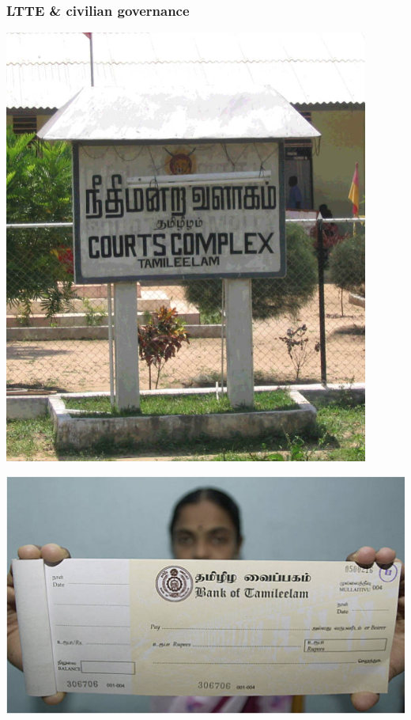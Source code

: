 \documentclass[aspectratio=43]{beamer}
\begin{document}
\begin{frame}
\frametitle{LTTE \& civilian governance}
\centering

\begin{minipage}{0.4\textwidth}\centering
  \includegraphics[width = 0.9\textwidth]{img/tamileelam_courts}
  \vfill
\end{minipage}\hfill
\begin{minipage}{0.59\textwidth}\centering
  \includegraphics[width = \textwidth]{img/tamileelam_bank}\\

\end{minipage}
\end{frame}
\end{document}
